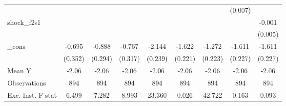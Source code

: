 {\begin{tabular}{l*{8}{c}}
            &                     &                     &                     &                     &                     &                     &     (0.007)         &                     \\
\addlinespace
shock\_f2s1  &                     &                     &                     &                     &                     &                     &                     &      -0.001         \\
            &                     &                     &                     &                     &                     &                     &                     &     (0.005)         \\
\addlinespace
\_cons      &      -0.695\sym{*}  &      -0.888\sym{***}&      -0.767\sym{**} &      -2.144\sym{***}&      -1.622\sym{***}&      -1.272\sym{***}&      -1.611\sym{***}&      -1.611\sym{***}\\
            &     (0.352)         &     (0.294)         &     (0.317)         &     (0.239)         &     (0.221)         &     (0.223)         &     (0.227)         &     (0.227)         \\
\midrule
Mean Y      &       -2.06         &       -2.06         &       -2.06         &       -2.06         &       -2.06         &       -2.06         &       -2.06         &       -2.06         \\
Observations&         894         &         894         &         894         &         894         &         894         &         894         &         894         &         894         \\
Exc. Inst. F-stat&       6.499         &       7.282         &       8.993         &      23.360         &       0.026         &      42.722         &       0.163         &       0.093         \\
\bottomrule
\end{tabular}
}
